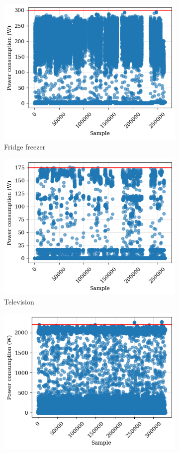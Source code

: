 \begin{figure}
\begin{subfigure}{.5\textwidth}
    \includegraphics[width=.9\linewidth]{images/raw_consumptions/fridge.png}
    \caption{Fridge freezer}
    \label{fig:fridge_freezer}
  \end{subfigure}%
  \begin{subfigure}{.5\textwidth}
    \centering
    \includegraphics[width=.9\linewidth]{images/raw_consumptions/television.png}
    \caption{Television}
    \label{fig:television}
  \end{subfigure}
  \begin{subfigure}{.5\textwidth}
    \centering
    \includegraphics[width=.9\linewidth]{images/raw_consumptions/microwave.png}

\end{subfigure}
\end{figure}
